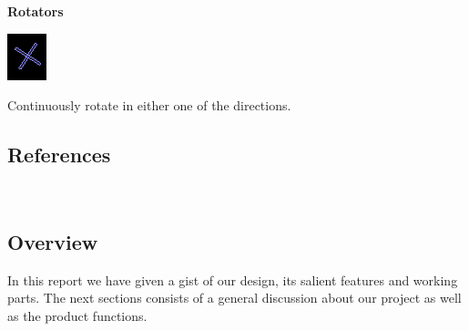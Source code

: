 \documentclass{article}
\begin{document}
    \textbf{Rotators}

    \begin{minipage}[t]{0.25\textwidth}
        \vspace{0pt}
        \centering
        \includegraphics[width=0.9\linewidth,natwidth=610,natheight=642]{rotators.png} 
        \label{fig:rotators}
    \end{minipage}
    \begin{minipage}[t]{0.6\textwidth}
        \vspace{0pt}
        Continuously rotate in either one of the directions.
    \end{minipage}

    \subsection{References}
    ~\cite{gprof}    
    ~\cite{stack}
    ~\cite{Adit}
    ~\cite{cocos2d}
    ~\cite{iforce}

    {}
    

    \subsection{Overview}
    In this report we have given a gist of our design, its salient features and working parts.
    The next sections consists of a general discussion about our project as well as the product functions.
\end{document}

